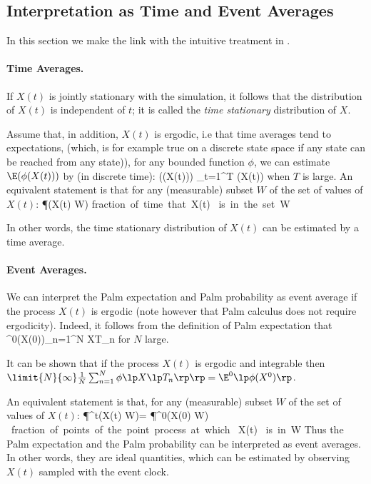 \subsection{Interpretation as Time and Event Averages}
In this section we make the link with the intuitive treatment in
.

\paragraph*{Time Averages.} If $X(t)$ is jointly stationary with the simulation, it follows
that the distribution of $X(t)$ is independent of $t$; it is called
the \emph{time stationary} distribution of $X$.

Assume that, in addition, $X(t)$ is ergodic, i.e that time
averages tend to expectations, (which, is for example true on a
discrete state space if any state can be reached from any
state)), for any bounded function $\phi$, we can estimate
$\E(\phi(X(t)))$ by (in discrete time):
 \ben
 \E(\phi(X(t))) \approx {}\sum_{t=1}^T \phi(X(t))
 \een
when $T$ is large. An equivalent statement is that for any
(measurable) subset $W$ of the set of values of $X(t)$:
 \ben
 \P(X(t) \in W) \approx \mbox{fraction of time that }X(t) \mbox{ is in the set }W
 \een

In other words, the time stationary distribution of $X(t)$ can be
estimated by a time average.

\paragraph*{Event Averages.}  We can interpret the
Palm expectation and Palm probability as event average if the
process $X(t)$ is ergodic (note however that Palm calculus does not
require ergodicity). Indeed, it follows from the definition of Palm
expectation that
 \ben
 \E^0\lp\phi(X(0))\rp\approx  {}\sum_{n=1}^N
\phi\lp X\lp T_n\rp\rp
 \een
for $N$ large.
 \begin{petit}It can be shown \cite{baccelli-87} that if the process
$X(t)$ is ergodic and integrable then
$\limit{N}{\infty}\frac{1}{N}\sum_{n=1}^N \phi \lp X\lp
T_n\rp\rp=\E^0\lp\phi(X^0)\rp$.

 \end{petit}
An equivalent statement is that, for any (measurable) subset $W$ of
the set of values of $X(t)$:
 \ben
 \P^t(X(t) \in W)= \P^0(X(0) \in W) \approx\mbox{ fraction of points
 of the point process at
 which }  X(t) \mbox{ is in }W
 \een
 Thus the Palm expectation and the Palm probability can be
 interpreted as event averages. In other words, they are ideal
 quantities, which can be estimated by observing $X(t)$ sampled with
 the event clock.

